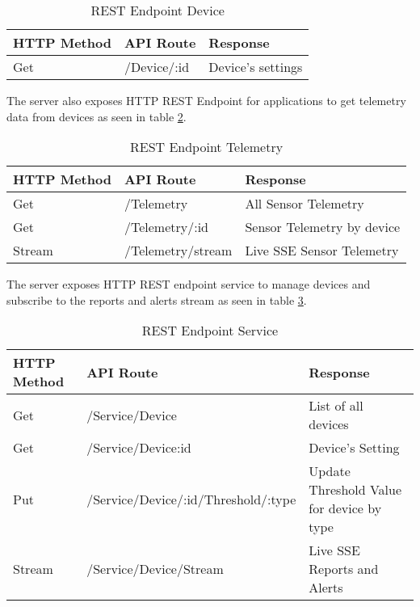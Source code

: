 \begin{table}[H]
    \centering
    \begin{tabular}{|l|l|l|}
    \hline
    \textbf{HTTP Method}    & \textbf{API Route} & \textbf{Response} \\ \hline
    Get & /Device/:id & Device's settings  \\ \hline
    \end{tabular}
    \caption{REST Endpoint Device}
    \label{tbl:device}
\end{table}
The server also exposes HTTP REST Endpoint for applications to get telemetry data from devices as seen in table \ref{tbl:telemetry}.

\begin{table}[H]
    \centering
    \begin{tabular}{|l|l|p{5cm}|}
    \hline
    \textbf{HTTP Method}    & \textbf{API Route} & \textbf{Response} \\ \hline
    Get & /Telemetry & All Sensor Telemetry  \\ \hline
    Get & /Telemetry/:id & Sensor Telemetry by device \\ \hline
    Stream & /Telemetry/stream & Live SSE Sensor Telemetry  \\ \hline
    \end{tabular}
    \caption{REST Endpoint Telemetry}
    \label{tbl:telemetry}
\end{table}
The server exposes HTTP REST endpoint service to manage devices and subscribe to the reports and alerts stream as seen in table \ref{tbl:service}.

    \begin{table}[H]
        \centering
        \begin{tabular}{|l|l|p{5cm}|}
        \hline
        \textbf{HTTP Method}    & \textbf{API Route} & \textbf{Response} \\ \hline
        Get & /Service/Device & List of all devices  \\ \hline
        Get & /Service/Device:id & Device's Setting \\ \hline
        Put & /Service/Device/:id/Threshold/:type & Update Threshold Value for device by type  \\ \hline
        Stream & /Service/Device/Stream & Live SSE Reports and Alerts \\ \hline
        \end{tabular}
        \caption{REST Endpoint Service}
        \label{tbl:service}
    \end{table}

